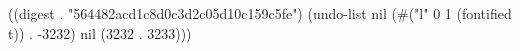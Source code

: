 
((digest . "564482acd1c8d0c3d2c05d10c159c5fe") (undo-list nil (#("l" 0 1 (fontified t)) . -3232) nil (3232 . 3233)))
